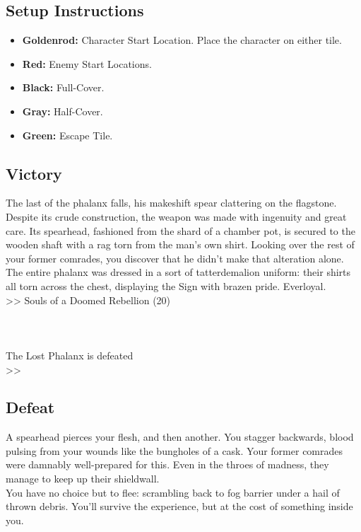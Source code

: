 \subsection*{Setup Instructions}
\begin{itemize}
\item \textbf{Goldenrod:} Character Start Location. Place the character on either tile.
\item \textbf{Red:} Enemy Start Locations.
\item \textbf{Black:} Full-Cover.
\item \textbf{Gray:} Half-Cover.
\item \textbf{Green:} Escape Tile.
\end{itemize}

\pagebreak

\subsection*{Victory}
The last of the phalanx falls, his makeshift spear clattering on the flagstone. Despite its crude construction, the weapon was made with ingenuity and great care. Its spearhead, fashioned from the shard of a chamber pot, is secured to the wooden shaft with a rag torn from the man’s own shirt. Looking over the rest of your former comrades, you discover that he didn’t make that alteration alone. The entire phalanx was dressed in a sort of tatterdemalion uniform: their shirts all torn across the chest, displaying the Sign with brazen pride. Everloyal.\\

>> Souls of a Doomed Rebellion (20)\\
\\
\\
\\
 The Lost Phalanx is defeated\\
>> 

\subsection*{Defeat}
A spearhead pierces your flesh, and then another. You stagger backwards, blood pulsing from your wounds like the bungholes of a cask. Your former comrades were damnably well-prepared for this. Even in the throes of madness, they manage to keep up their shieldwall.\\

You have no choice but to flee: scrambling back to fog barrier under a hail of thrown debris. You’ll survive the experience, but at the cost of something inside you.\\

